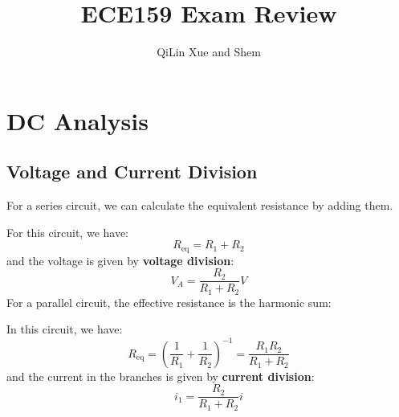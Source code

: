 \documentclass{article}
\title{ECE159 Exam Review}
\author{QiLin Xue and Shem}
\begin{document}
    \maketitle
    \tableofcontents
    \newpage
    \section{DC Analysis}
    \subsection{Voltage and Current Division}
    For a series circuit, we can calculate the equivalent resistance by adding them.
    \begin{center}
    \end{center}
    For this circuit, we have:
    \begin{equation}
        R_\text{eq} = R_1 + R_2
    \end{equation}
    and the voltage is given by \textbf{voltage division}:
    \begin{equation}
        V_A = \frac{R_2}{R_1+R_2}V
    \end{equation}
    For a parallel circuit, the effective resistance is the harmonic sum:
    \begin{center}
    \end{center}
    In this circuit, we have:
    \begin{equation}
        R_\text{eq} = \left(\frac{1}{R_1} + \frac{1}{R_2}\right)^{-1} = \frac{R_1R_2}{R_1+R_2}
    \end{equation}
    and the current in the branches is given by \textbf{current division}:
    \begin{equation}
        i_1 = \frac{R_2}{R_1+R_2}i
    \end{equation}
\end{document}
